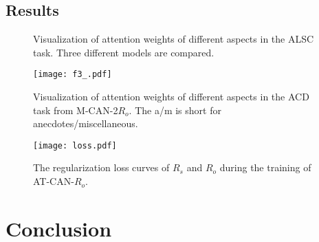 \documentclass[11pt,a4paper]{article}
\begin{document}
\subsection{Results}

\begin{figure}
\setlength{\abovecaptionskip}{0.1cm}   %
\setlength{\belowcaptionskip}{-0.2cm}   %
\centering
{}
\vspace{-5pt}
\vspace{-5pt}
\caption{Visualization of attention weights of different aspects in the ALSC task. Three different models are compared.}
\label{compare-att}
\end{figure}

\begin{figure}
\setlength{\abovecaptionskip}{0.1cm}   %
\setlength{\belowcaptionskip}{-0.4cm}   %
\centering
\texttt{[image: f3\_.pdf]}
\caption{Visualization of attention weights of different aspects in the ACD task from M-CAN-2$R_o$. The a/m is short for anecdotes/miscellaneous.} 
  \label{ACD-att} 
\end{figure}

\begin{figure}
\setlength{\abovecaptionskip}{0.1cm}   %
\setlength{\belowcaptionskip}{-0.5cm}   %
\centering
\texttt{[image: loss.pdf]}
\caption{The regularization loss curves of $R_s$ and $R_o$ during the training of AT-CAN-$R_o$.} 
  \label{figure:reg-loss} 
\end{figure}

\section{Conclusion}




\end{document}
